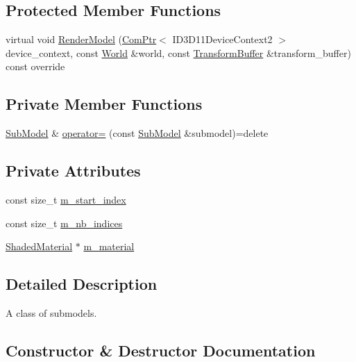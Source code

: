 \subsection*{Protected Member Functions}
\begin{DoxyCompactItemize}
\item 
virtual void \hyperlink{classmage_1_1_sub_model_a8f5b7ce6498df58d44dd41cc3c42267b}{Render\+Model} (\hyperlink{namespacemage_ae74f374780900893caa5555d1031fd79}{Com\+Ptr}$<$ I\+D3\+D11\+Device\+Context2 $>$ device\+\_\+context, const \hyperlink{classmage_1_1_world}{World} \&world, const \hyperlink{structmage_1_1_transform_buffer}{Transform\+Buffer} \&transform\+\_\+buffer) const override
\end{DoxyCompactItemize}
\subsection*{Private Member Functions}
\begin{DoxyCompactItemize}
\item 
\hyperlink{classmage_1_1_sub_model}{Sub\+Model} \& \hyperlink{classmage_1_1_sub_model_aafc8b4ba509ec78ea36719e98b1a0c99}{operator=} (const \hyperlink{classmage_1_1_sub_model}{Sub\+Model} \&submodel)=delete
\end{DoxyCompactItemize}
\subsection*{Private Attributes}
\begin{DoxyCompactItemize}
\item 
const size\+\_\+t \hyperlink{classmage_1_1_sub_model_a22db3ac71a33ed64a26bb2e4410eeb28}{m\+\_\+start\+\_\+index}
\item 
const size\+\_\+t \hyperlink{classmage_1_1_sub_model_a0471b8b0c4b7be0e696378238b25e7e7}{m\+\_\+nb\+\_\+indices}
\item 
\hyperlink{structmage_1_1_shaded_material}{Shaded\+Material} $\ast$ \hyperlink{classmage_1_1_sub_model_ac32eea7a1db56906ebf63b8683231999}{m\+\_\+material}
\end{DoxyCompactItemize}


\subsection{Detailed Description}
A class of submodels. 

\subsection{Constructor \& Destructor Documentation}
\hypertarget{classmage_1_1_sub_model_a26dce7b076af1edb4209d0a236a250ef}{}\label{classmage_1_1_sub_model_a26dce7b076af1edb4209d0a236a250ef} 
